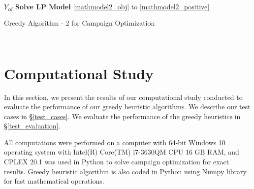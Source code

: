 \documentclass[11pt]{article}
\begin{document}
\begin{algorithm}[H]
\\
$Y_{{c}{d}}$ \gets \textbf{Solve LP Model} \eqref{mathmodel2_obj} to \eqref{mathmodel2_positive}
\\
\;
\caption{Greedy Algorithm - 2 for Campaign Optimization}
\label{algo:change}
\end{algorithm}\\

\section{Computational Study} \label{num-analysis}

In this section, we present the results of our computational study conducted to evaluate the performance of our greedy heuristic algorithms. We describe our test cases in \S \ref{test_cases}. We evaluate the performance of the greedy heuristics in \S \ref{test_evaluation}.

All computations were performed on a computer with 64-bit Windows 10 operating system with Intel(R) Core(TM) i7-3630QM CPU 16 GB RAM, and CPLEX 20.1 was used in Python to solve campaign optimization for exact results. Greedy heuristic algorithm is also coded in Python using Numpy library for fast mathematical operations.
\end{document}
